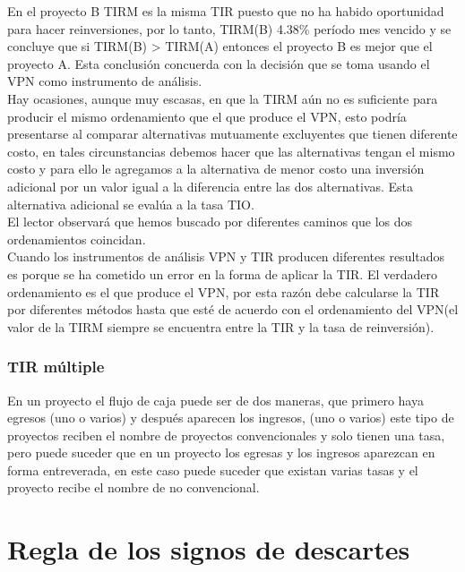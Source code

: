 En el proyecto B TIRM es la misma TIR puesto que no ha habido oportunidad para hacer reinversiones, por lo tanto, TIRM(B) 4.38\% período mes vencido y se concluye que si          TIRM(B) > TIRM(A) entonces el proyecto B es mejor que el proyecto A. Esta conclusión concuerda con la decisión que se toma usando el VPN como instrumento de análisis.\\

Hay ocasiones, aunque muy escasas, en que la TIRM aún no es suficiente para producir el mismo ordenamiento que el que produce el VPN, esto podría presentarse al comparar alternativas mutuamente excluyentes que tienen diferente costo, en tales circunstancias debemos hacer que las alternativas tengan el mismo costo y para ello le agregamos a la alternativa de menor costo una inversión adicional por un valor igual a la diferencia entre las dos alternativas. Esta alternativa adicional se evalúa a la tasa TIO.\\




El lector observará que hemos buscado por diferentes caminos que los dos ordenamientos coincidan. \\
Cuando los instrumentos de análisis VPN y TIR producen diferentes resultados es porque se ha cometido un error en la forma de aplicar la TIR. El verdadero ordenamiento es el que produce el VPN, por esta razón debe calcularse la TIR por diferentes métodos hasta que esté de acuerdo con el ordenamiento del VPN(el valor de la TIRM siempre se encuentra entre la TIR y la tasa de reinversión).\\

\subsubsection{TIR múltiple}

En un proyecto el flujo de caja puede ser de dos maneras, que primero haya egresos (uno o varios) y después aparecen los ingresos, (uno o varios) este tipo de proyectos reciben el nombre de proyectos convencionales y solo tienen una tasa, pero puede suceder que en un proyecto los egresas y los ingresos aparezcan en forma entreverada, en este caso puede suceder que existan varias tasas y el proyecto recibe el nombre de no convencional.\\


\section{Regla de los signos de descartes}



